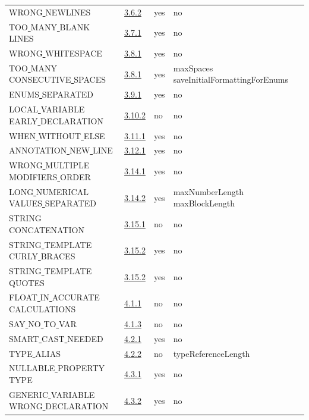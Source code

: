 \begin{longtable}{ |l|p{0.8cm}|p{0.8cm}| p{3cm} | }
WRONG\underline{ }NEWLINES & \hyperref[sec:3.6.2]{3.6.2} &  yes  &   no  \\
TOO\underline{ }MANY\underline{ }BLANK\underline{ }LINES & \hyperref[sec:3.7.1]{3.7.1} &  yes  &   no  \\
WRONG\underline{ }WHITESPACE & \hyperref[sec:3.8.1]{3.8.1} &  yes  &   no  \\
TOO\underline{ }MANY\underline{ }CONSECUTIVE\underline{ }SPACES & \hyperref[sec:3.8.1]{3.8.1} &  yes  &   maxSpaces saveInitialFormattingForEnums  \\
ENUMS\underline{ }SEPARATED & \hyperref[sec:3.9.1]{3.9.1} &  yes  &   no  \\
LOCAL\underline{ }VARIABLE\underline{ }EARLY\underline{ }DECLARATION & \hyperref[sec:3.10.2]{3.10.2} &  no  &   no  \\
WHEN\underline{ }WITHOUT\underline{ }ELSE & \hyperref[sec:3.11.1]{3.11.1} &  yes  &   no  \\
ANNOTATION\underline{ }NEW\underline{ }LINE & \hyperref[sec:3.12.1]{3.12.1} &  yes  &   no  \\
WRONG\underline{ }MULTIPLE\underline{ }MODIFIERS\underline{ }ORDER & \hyperref[sec:3.14.1]{3.14.1} &  yes  &   no  \\
LONG\underline{ }NUMERICAL\underline{ }VALUES\underline{ }SEPARATED & \hyperref[sec:3.14.2]{3.14.2} &  yes  &   maxNumberLength maxBlockLength \\
STRING\underline{ }CONCATENATION & \hyperref[sec:3.15.1]{3.15.1} &  no  &   no  \\
STRING\underline{ }TEMPLATE\underline{ }CURLY\underline{ }BRACES & \hyperref[sec:3.15.2]{3.15.2} &  yes  &   no  \\
STRING\underline{ }TEMPLATE\underline{ }QUOTES & \hyperref[sec:3.15.2]{3.15.2} &  yes  &   no  \\
FLOAT\underline{ }IN\underline{ }ACCURATE\underline{ }CALCULATIONS & \hyperref[sec:4.1.1]{4.1.1} &  no  &   no  \\
SAY\underline{ }NO\underline{ }TO\underline{ }VAR & \hyperref[sec:4.1.3]{4.1.3} &  no  &   no  \\
SMART\underline{ }CAST\underline{ }NEEDED & \hyperref[sec:4.2.1]{4.2.1} &  yes  &   no  \\
TYPE\underline{ }ALIAS & \hyperref[sec:4.2.2]{4.2.2} &  no  &   typeReferenceLength        \\
NULLABLE\underline{ }PROPERTY\underline{ }TYPE & \hyperref[sec:4.3.1]{4.3.1} &  yes  &   no  \\
GENERIC\underline{ }VARIABLE\underline{ }WRONG\underline{ }DECLARATION & \hyperref[sec:4.3.2]{4.3.2} &  yes  &   no  \\

\end{longtable}
